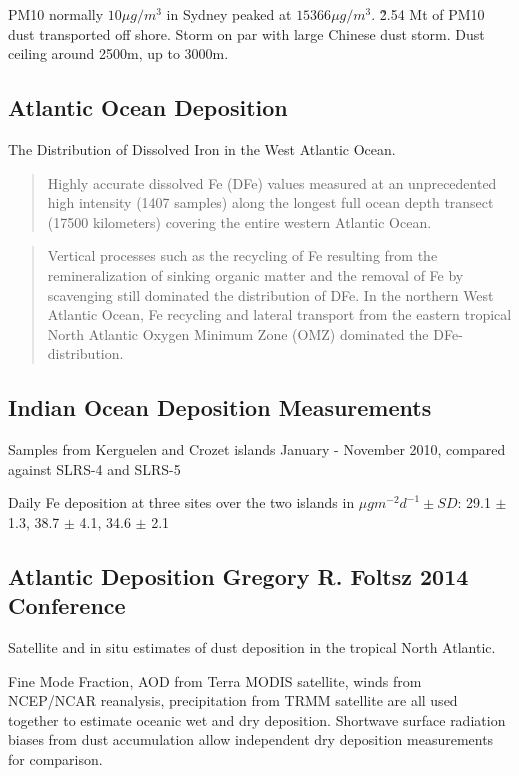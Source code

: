 PM10 normally $10{\mu}g/m^3$ in Sydney peaked at $15366{\mu}g/m^3$.
\~2.54 Mt of PM10 dust transported off shore.
Storm on par with large Chinese dust storm.
Dust ceiling around 2500m, up to 3000m.

\subsection{Atlantic Ocean Deposition \cite{Rijkenberg_2014}}
The Distribution of Dissolved Iron in the West Atlantic Ocean.

\begin{quote}
Highly accurate dissolved Fe (DFe) values measured at an unprecedented high intensity (1407 samples) along the longest full ocean depth transect (17500 kilometers) covering the entire western Atlantic Ocean.
\end{quote}

\begin{quote}
Vertical processes such as the recycling of Fe resulting from the remineralization of sinking organic matter and the removal of Fe by scavenging still dominated the distribution of DFe. In the northern West Atlantic Ocean, Fe recycling and lateral transport from the eastern tropical North Atlantic Oxygen Minimum Zone (OMZ) dominated the DFe-distribution.
\end{quote}

\subsection{Indian Ocean Deposition Measurements \cite{Heimburger_2013}}
Samples from Kerguelen and Crozet islands January - November 2010, compared against SLRS-4 and SLRS-5

Daily Fe deposition at three sites over the two islands in ${\mu}gm^{-2}d^{-1} \pm SD$:
29.1 $\pm$ 1.3, 38.7 $\pm$ 4.1, 34.6 $\pm$ 2.1

\subsection{Atlantic Deposition Gregory R. Foltsz 2014 Conference}
Satellite and in situ estimates of dust deposition in the tropical North Atlantic.

Fine Mode Fraction, AOD from Terra MODIS satellite, winds from NCEP/NCAR reanalysis, precipitation from TRMM satellite are all used together to estimate oceanic wet and dry deposition.
Shortwave surface radiation biases from dust accumulation allow independent dry deposition measurements for comparison.

